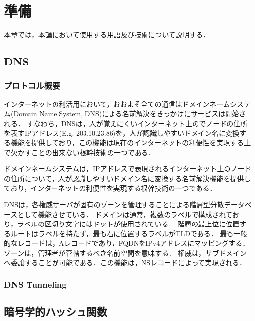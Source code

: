 \documentclass[12pt]{jarticle} %
\begin{document}
\newpage
\section{準備}
本章では，本論において使用する用語及び技術について説明する．
\subsection{DNS}
\subsubsection{プロトコル概要}
インターネットの利活用において，おおよそ全ての通信はドメインネームシステム(Domain Name System, DNS)\cite{rfc1034, rfc1035}による名前解決をきっかけにサービスは開始される．
すなわち，DNSは，人が覚えにくいインターネット上のでノードの住所を表すIPアドレス(E.g. 203.10.23.86)を，人が認識しやすいドメイン名に変換する機能を提供しており，この機能は現在のインターネットの利便性を実現する上で欠かすことの出来ない根幹技術の一つである．


ドメインネームシステムは，IPアドレスで表現されるインターネット上のノードの住所について，人が認識しやすいドメイン名に変換する名前解決機能を提供しており，インターネットの利便性を実現する根幹技術の一つである．

DNSは，各権威サーバが固有のゾーンを管理することによる階層型分散データベースとして機能させている．
ドメインは通常，複数のラベルで構成されており，ラベルの区切り文字にはドットが使用されている．
階層の最上位に位置するルートはラベルを持たず，最も右に位置するラベルがTLDである．
最も一般的なレコードは，Aレコードであり，FQDNをIPv4アドレスにマッピングする．
ゾーンは，管理者が管轄するべき名前空間を意味する．
権威は，サブドメインへ委譲することが可能である．この機能は，NSレコードによって実現される．
\subsubsection{DNS Tunneling}
\subsection{暗号学的ハッシュ関数}
\end{document}
